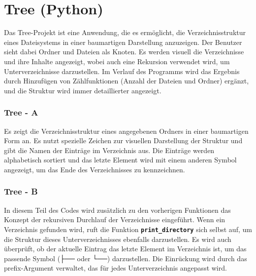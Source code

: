 \chapter{Tree (Python)}
Das Tree-Projekt ist eine Anwendung, die es ermöglicht, die Verzeichnisstruktur eines Dateisystems in einer baumartigen Darstellung anzuzeigen. Der Benutzer sieht dabei Ordner und Dateien als Knoten. Es werden visuell die Verzeichnisse und ihre Inhalte angezeigt, wobei auch eine Rekursion verwendet wird, um Unterverzeichnisse darzustellen. Im Verlauf des Programms wird das Ergebnis durch Hinzufügen von Zählfunktionen (Anzahl der Dateien und Ordner) ergänzt, und die Struktur wird immer detaillierter angezeigt.

\subsection*{Tree - A}
Es zeigt die Verzeichnisstruktur eines angegebenen Ordners in einer baumartigen Form an. Es nutzt spezielle Zeichen zur visuellen Darstellung der Struktur und gibt die Namen der Einträge im Verzeichnis aus. Die Einträge werden alphabetisch sortiert und das letzte Element wird mit einem anderen Symbol angezeigt, um das Ende des Verzeichnisses zu kennzeichnen.
\begin{codeblock}
    
\end{codeblock}

\subsection*{Tree - B}
In diesem Teil des Codes wird zusätzlich zu den vorherigen Funktionen das Konzept der rekursiven Durchlauf der Verzeichnisse eingeführt. Wenn ein Verzeichnis gefunden wird, ruft die Funktion \textbf{\texttt{print\_directory}} sich selbst auf, um die Struktur dieses Unterverzeichnisses ebenfalls darzustellen. Es wird auch überprüft, ob der aktuelle Eintrag das letzte Element im Verzeichnis ist, um das passende Symbol (├── oder └──) darzustellen. Die Einrückung wird durch das prefix-Argument verwaltet, das für jedes Unterverzeichnis angepasst wird.
\begin{codeblock}
    
\end{codeblock}

